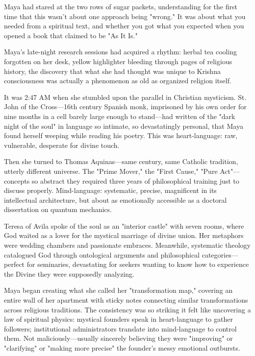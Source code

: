 \documentclass[12pt,twoside]{book}
\begin{document}
Maya had stared at the two rows of sugar packets, understanding for the first time that this wasn't about one approach being "wrong." It was about what you needed from a spiritual text, and whether you got what you expected when you opened a book that claimed to be "As It Is."

Maya's late-night research sessions had acquired a rhythm: herbal tea cooling forgotten on her desk, yellow highlighter bleeding through pages of religious history, the discovery that what she had thought was unique to Krishna consciousness was actually a phenomenon as old as organized religion itself.

It was 2:47 AM when she stumbled upon the parallel in Christian mysticism. St. John of the Cross—16th century Spanish monk, imprisoned by his own order for nine months in a cell barely large enough to stand—had written of the "dark night of the soul" in language so intimate, so devastatingly personal, that Maya found herself weeping while reading his poetry. This was heart-language: raw, vulnerable, desperate for divine touch.

Then she turned to Thomas Aquinas—same century, same Catholic tradition, utterly different universe. The "Prime Mover," the "First Cause," "Pure Act"—concepts so abstract they required three years of philosophical training just to discuss properly. Mind-language: systematic, precise, magnificent in its intellectual architecture, but about as emotionally accessible as a doctoral dissertation on quantum mechanics.

Teresa of Avila spoke of the soul as an "interior castle" with seven rooms, where God waited as a lover for the mystical marriage of divine union. Her metaphors were wedding chambers and passionate embraces. Meanwhile, systematic theology catalogued God through ontological arguments and philosophical categories—perfect for seminaries, devastating for seekers wanting to know how to experience the Divine they were supposedly analyzing.

Maya began creating what she called her "transformation map," covering an entire wall of her apartment with sticky notes connecting similar transformations across religious traditions. The consistency was so striking it felt like uncovering a law of spiritual physics: mystical founders speak in heart-language to gather followers; institutional administrators translate into mind-language to control them. Not maliciously—usually sincerely believing they were "improving" or "clarifying" or "making more precise" the founder's messy emotional outbursts.
\end{document}
